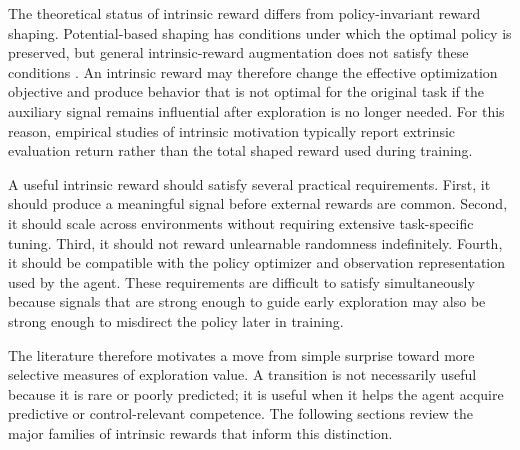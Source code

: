 The theoretical status of intrinsic reward differs from policy-invariant reward shaping.
Potential-based shaping has conditions under which the optimal policy is preserved, but general intrinsic-reward augmentation does not satisfy these conditions \parencite{ng-1999}.
An intrinsic reward may therefore change the effective optimization objective and produce behavior that is not optimal for the original task if the auxiliary signal remains influential after exploration is no longer needed.
For this reason, empirical studies of intrinsic motivation typically report extrinsic evaluation return rather than the total shaped reward used during training.

A useful intrinsic reward should satisfy several practical requirements.
First, it should produce a meaningful signal before external rewards are common.
Second, it should scale across environments without requiring extensive task-specific tuning.
Third, it should not reward unlearnable randomness indefinitely.
Fourth, it should be compatible with the policy optimizer and observation representation used by the agent.
These requirements are difficult to satisfy simultaneously because signals that are strong enough to guide early exploration may also be strong enough to misdirect the policy later in training.

The literature therefore motivates a move from simple surprise toward more selective measures of exploration value.
A transition is not necessarily useful because it is rare or poorly predicted; it is useful when it helps the agent acquire predictive or control-relevant competence.
The following sections review the major families of intrinsic rewards that inform this distinction.